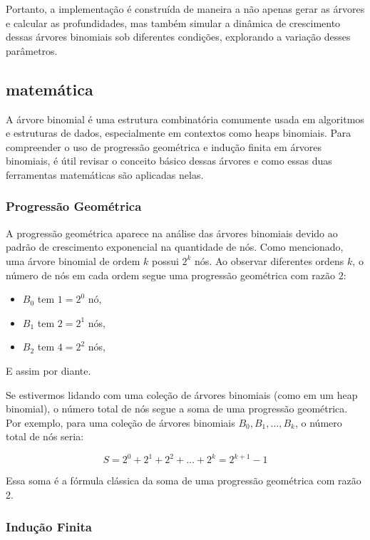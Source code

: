 \documentclass[12pt, a4paper]{scrreprt}
\begin{document}
\newpage

Portanto, a implementação é construída de maneira a não apenas gerar as árvores e calcular as profundidades, mas também simular a dinâmica de crescimento dessas árvores binomiais sob diferentes condições, explorando a variação desses parâmetros.

\subsection*{matemática}
A árvore binomial é uma estrutura combinatória comumente usada em algoritmos e estruturas de dados, especialmente em contextos como heaps binomiais. Para compreender o uso de progressão geométrica e indução finita em árvores binomiais, é útil revisar o conceito básico dessas árvores e como essas duas ferramentas matemáticas são aplicadas nelas.

\subsubsection*{Progressão Geométrica}

A progressão geométrica aparece na análise das árvores binomiais devido ao padrão de crescimento exponencial na quantidade de nós. Como mencionado, uma árvore binomial de ordem \( k \) possui \( 2^k \) nós. Ao observar diferentes ordens \( k \), o número de nós em cada ordem segue uma progressão geométrica com razão \( 2 \):
\begin{itemize}
    \item \( B_0 \) tem \( 1 = 2^0 \) nó,
    \item \( B_1 \) tem \( 2 = 2^1 \) nós,
    \item \( B_2 \) tem \( 4 = 2^2 \) nós,
\end{itemize} 
E assim por diante.

Se estivermos lidando com uma coleção de árvores binomiais (como em um heap binomial), o número total de nós segue a soma de uma progressão geométrica. Por exemplo, para uma coleção de árvores binomiais \( B_0, B_1, \ldots, B_k \), o número total de nós seria:

\[
S = 2^0 + 2^1 + 2^2 + \dots + 2^k = 2^{k+1} - 1
\]

Essa soma é a fórmula clássica da soma de uma progressão geométrica com razão 2.

\subsubsection{Indução Finita}
\end{document}
